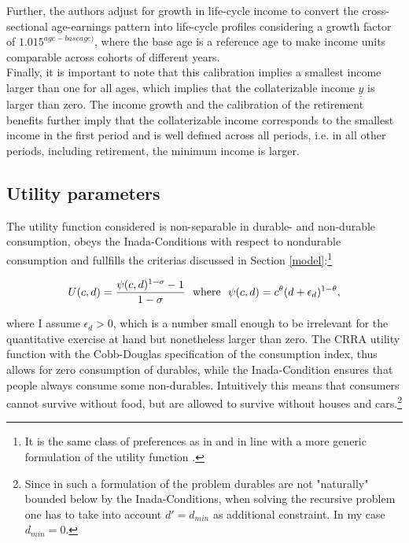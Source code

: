 \documentclass[a4paper,12pt,legno]{article}
\begin{document}
Further, the authors adjust for growth in life-cycle income to convert the cross-sectional age-earnings pattern into life-cycle profiles considering a growth factor of $1.015^{age-base age)}$, where the base age is a reference age to make income units comparable across cohorts of different years. \\
Finally, it is important to note that this calibration implies a smallest income larger than one for all ages, which implies that the collaterizable income $\underline{y}$ is larger than zero. The income growth and the calibration of the retirement benefits further imply that the collaterizable income corresponds to the smallest income in the first period and is well defined across all periods, i.e. in all other periods, including retirement, the minimum income is larger. 

\subsection{Utility parameters}

The utility function considered is non-separable in durable- and non-durable consumption, obeys the Inada-Conditions with respect to nondurable consumption and fullfills the criterias discussed in Section \ref{model}:\footnote{It is the same class of preferences as in \cite{hintermaier2010} and in line with a more generic formulation of the utility function \citep{FV&K2011}.}

\begin{equation}
U(c,d)=\frac{\psi(c,d)^{1-\sigma}-1}{1-\sigma} \ \ \textnormal{where} \ \ \psi(c,d)=c^{\theta}(d+\epsilon_{d})^{1-\theta},
\end{equation}

where I assume $\epsilon_{d} > 0$, which is a number small enough to be irrelevant for the quantitative exercise at hand but nonetheless larger than zero. The CRRA utility function with the Cobb-Douglas specification of the consumption index, thus allows for zero consumption of durables, while the Inada-Condition ensures that people always consume some non-durables. Intuitively this means that consumers cannot survive without food, but are allowed to survive without houses and cars.\footnote{Since in such a formulation of the problem durables are not "naturally" bounded below by the Inada-Conditions, when solving the recursive problem one has to take into account $d' = d_{min}$ as additional constraint. In my case $d_{min} = 0$.}
\end{document}
